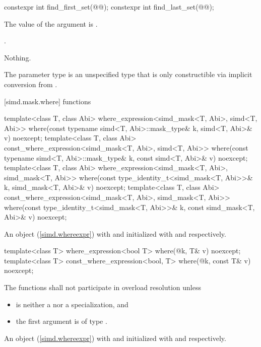 \begin{itemdecl}
constexpr int find_first_set(@@);
constexpr int find_last_set(@@);
\end{itemdecl}

\begin{itemdescr}
  \pnum\requires
  The value of the argument is .

  \pnum\returns
  .

  \pnum\throws Nothing.

  \pnum\remarks
  The parameter type  is an unspecified type that is only constructible via implicit conversion from .
\end{itemdescr}

[simd.mask.where]{ functions}

\begin{itemdecl}
template<class T, class Abi>
  where_expression<simd_mask<T, Abi>, simd<T, Abi>>
    where(const typename simd<T, Abi>::mask_type& k, simd<T, Abi>& v) noexcept;
template<class T, class Abi>
  const_where_expression<simd_mask<T, Abi>, simd<T, Abi>>
    where(const typename simd<T, Abi>::mask_type& k, const simd<T, Abi>& v) noexcept;
template<class T, class Abi>
  where_expression<simd_mask<T, Abi>, simd_mask<T, Abi>>
    where(const type_identity_t<simd_mask<T, Abi>>& k, simd_mask<T, Abi>& v) noexcept;
template<class T, class Abi>
  const_where_expression<simd_mask<T, Abi>, simd_mask<T, Abi>>
    where(const type_identity_t<simd_mask<T, Abi>>& k, const simd_mask<T, Abi>& v) noexcept;
\end{itemdecl}

\begin{itemdescr}
  \pnum\returns
  An object (\ref{simd.whereexpr}) with  and  initialized with  and  respectively.
\end{itemdescr}

\begin{itemdecl}
template<class T>
  where_expression<bool T>
    where(@\seebelow@ k, T& v) noexcept;
template<class T>
  const_where_expression<bool, T>
    where(@\seebelow@ k, const T& v) noexcept;
\end{itemdecl}

\begin{itemdescr}
  \pnum\remarks
  The functions shall not participate in overload resolution unless

  \begin{itemize}
    \item {} is neither a  nor a  specialization, and
    \item the first argument is of type .
  \end{itemize}

  \pnum\returns
  An object (\ref{simd.whereexpr}) with  and  initialized with  and  respectively.
\end{itemdescr}

